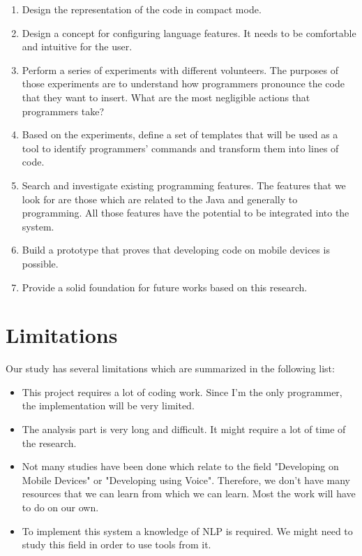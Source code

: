 \begin{enumerate}
	\item Design the representation of the code in compact mode.
	\item Design a concept for configuring language features. It needs to be comfortable and intuitive for the user.
	\item Perform a series of experiments with different volunteers. The purposes of those experiments are to understand how programmers pronounce the code that they want to insert. What are the most negligible actions that programmers take?
	\item Based on the experiments, define a set of templates that will be used as a tool to identify programmers’ commands and transform them into lines of code.
	\item Search and investigate existing programming features. The features that we look for are those which are related to the Java and generally to programming. All those features have the potential to be integrated into the system.
	\item Build a prototype that proves that developing code on mobile devices is possible.
	\item Provide a solid foundation for future works based on this research.
\end{enumerate}
\section{Limitations}
Our study has several limitations which are summarized in the following list: 
\begin{itemize}
	\item This project requires a lot of coding work. Since I'm the only programmer, the implementation will be very limited.
	\item The analysis part is very long and difficult. It might require a lot of time of the research.
	\item Not many studies have been done which relate to the field "Developing on Mobile Devices" or "Developing using Voice". Therefore, we don't have many resources that we can learn from which we can learn. Most the work will have to do on our own.
	\item To implement this system a knowledge of NLP is required. We might need to study this field in order to use tools from it.
\end{itemize}
